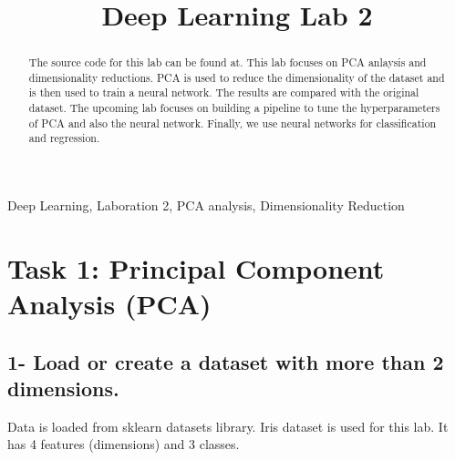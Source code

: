 \documentclass[conference]{IEEEtran}
\begin{document}
\title{Deep Learning Lab 2 \\
}

\author{
\and
{}
\and
{}
}

\maketitle

\thispagestyle{plain}
\pagestyle{plain}


\begin{IEEEkeywords}
Deep Learning, Laboration 2, PCA analysis, Dimensionality Reduction
\end{IEEEkeywords}
\begin{abstract}
    The source code for this lab can be found at\cite{dataset}. This lab focuses on PCA anlaysis and dimensionality reductions. PCA is used to reduce the dimensionality of the dataset and is then used to train a neural network. The results are compared with the original dataset. The upcoming lab focuses on building a pipeline to tune the hyperparameters of PCA and also the neural network. Finally, we use neural networks for classification and regression.
    
\end{abstract}

\section{Task 1: Principal Component Analysis (PCA)}
\subsection{1- Load or create a dataset with more than 2 dimensions.}
Data is loaded from sklearn datasets library. Iris dataset is used for this lab. It has 4 features (dimensions) and 3 classes.
\end{document}
